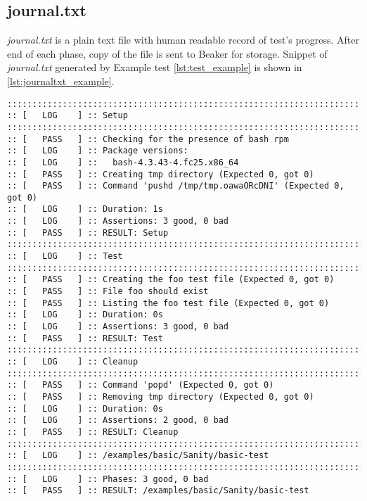 \subsection{journal.txt}
\textit{journal.txt} is a plain text file with human readable record of test's progress. After end of each phase, copy of the file is sent to Beaker for storage. Snippet of \textit{journal.txt} generated by Example test \ref{lst:test_example} is shown in \ref{lst:journaltxt_example}.

\begin{minipage}{\linewidth}
\begin{lstlisting}[style=txt,caption={Example of journal.txt},label={lst:journaltxt_example}]
::::::::::::::::::::::::::::::::::::::::::::::::::::::::::::::::::::::::::::::::
:: [   LOG    ] :: Setup
::::::::::::::::::::::::::::::::::::::::::::::::::::::::::::::::::::::::::::::::
:: [   PASS   ] :: Checking for the presence of bash rpm
:: [   LOG    ] :: Package versions:
:: [   LOG    ] ::   bash-4.3.43-4.fc25.x86_64
:: [   PASS   ] :: Creating tmp directory (Expected 0, got 0)
:: [   PASS   ] :: Command 'pushd /tmp/tmp.oawaORcDNI' (Expected 0, got 0)
:: [   LOG    ] :: Duration: 1s
:: [   LOG    ] :: Assertions: 3 good, 0 bad
:: [   PASS   ] :: RESULT: Setup
::::::::::::::::::::::::::::::::::::::::::::::::::::::::::::::::::::::::::::::::
:: [   LOG    ] :: Test
::::::::::::::::::::::::::::::::::::::::::::::::::::::::::::::::::::::::::::::::
:: [   PASS   ] :: Creating the foo test file (Expected 0, got 0)
:: [   PASS   ] :: File foo should exist
:: [   PASS   ] :: Listing the foo test file (Expected 0, got 0)
:: [   LOG    ] :: Duration: 0s
:: [   LOG    ] :: Assertions: 3 good, 0 bad
:: [   PASS   ] :: RESULT: Test
::::::::::::::::::::::::::::::::::::::::::::::::::::::::::::::::::::::::::::::::
:: [   LOG    ] :: Cleanup
::::::::::::::::::::::::::::::::::::::::::::::::::::::::::::::::::::::::::::::::
:: [   PASS   ] :: Command 'popd' (Expected 0, got 0)
:: [   PASS   ] :: Removing tmp directory (Expected 0, got 0)
:: [   LOG    ] :: Duration: 0s
:: [   LOG    ] :: Assertions: 2 good, 0 bad
:: [   PASS   ] :: RESULT: Cleanup
::::::::::::::::::::::::::::::::::::::::::::::::::::::::::::::::::::::::::::::::
:: [   LOG    ] :: /examples/basic/Sanity/basic-test
::::::::::::::::::::::::::::::::::::::::::::::::::::::::::::::::::::::::::::::::
:: [   LOG    ] :: Phases: 3 good, 0 bad
:: [   PASS   ] :: RESULT: /examples/basic/Sanity/basic-test
\end{lstlisting}
\end{minipage}

